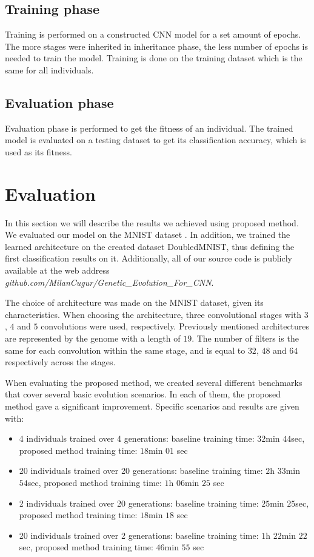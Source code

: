 \documentclass[eng]{simposium}
\begin{document}
\subsection{Training phase} 
Training is performed on a constructed CNN model for a set amount of epochs.  
The more stages were inherited in inheritance phase, the less number of epochs is needed to train the model. 
Training is done on the training dataset which is the same for all individuals. 

\subsection{Evaluation phase} 
Evaluation phase is performed to get the fitness of an individual. 
The trained model is evaluated on a testing dataset to get its classification accuracy, which is used as its fitness. 

\section{Evaluation} 

In this section we will describe the results we achieved using proposed method.  
We evaluated our model on the MNIST dataset \cite{8}. In addition, we trained the learned architecture on the  
created dataset DoubledMNIST, thus defining the first classification results on it.  
Additionally, all of our source code is publicly available at the web address \textit{github.com/MilanCugur/Genetic\_Evolution\_For\_CNN}.  

The choice of architecture was made on the MNIST dataset, given its characteristics.  
When choosing the architecture, three convolutional stages with $3$, $4$ and $5$ convolutions were used, respectively.  
Previously mentioned architectures are represented by the genome with a length of $19$. 
The number of filters is the same for each convolution within the same stage, and is equal to $32$, $48$ and $64$ respectively across the stages.  

When evaluating the proposed method, we created several different benchmarks that cover several basic evolution scenarios.  
In each of them, the proposed method gave a significant improvement.  
Specific scenarios and results are given with: 
\begin{itemize} 
  \item 4 individuals trained over 4 generations: baseline training time: $32$min $44$sec, proposed method training time: $18$min $01$ sec 
  \item 20 individuals trained over 20 generations: baseline training time: $2$h $33$min $54$sec, proposed method training time: $1$h $06$min $25$ sec 
  \item 2 individuals trained over 20 generations: baseline training time: $25$min $25$sec, proposed method training time: $18$min $18$ sec 
  \item 20 individuals trained over 2 generations: baseline training time: $1$h $22$min $22$sec, proposed method training time: $46$min $55$ sec 
\end{itemize} 
\end{document}
